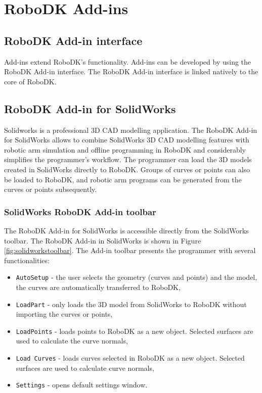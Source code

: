 \section{RoboDK Add-ins}

\subsection{RoboDK Add-in interface}

Add-ins extend RoboDK's functionality. Add-ins can be developed by using the RoboDK Add-in interface. The RoboDK Add-in interface is linked natively to the core of RoboDK.

\subsection{RoboDK Add-in for SolidWorks}

Solidworks is a professional 3D CAD modelling application. The RoboDK Add-in for SolidWorks allows to combine SolidWorks 3D CAD modelling features with robotic arm simulation and offline programming in RoboDK and considerably simplifies the programmer's workflow. The programmer can load the 3D models created in SolidWorks directly to RoboDK. Groups of curves or points can also be loaded to RoboDK, and robotic arm programs can be generated from the curves or points subsequently.

\subsubsection*{SolidWorks RoboDK Add-in toolbar}

The RoboDK Add-in for SolidWorks is accessible directly from the SolidWorks toolbar.  The RoboDK Add-in in SolidWorks is shown in Figure  \ref{fig:solidworkstoolbar}. The Add-in toolbar presents the programmer with several functionalities:

\begin{itemize}
    \item \texttt{AutoSetup} - the user selects the geometry (curves and points) and the model, the curves are automatically transferred to RoboDK,
    \item \texttt{LoadPart} - only loads the 3D model from SolidWorks to RoboDK without importing the curves or points,
    \item \texttt{LoadPoints} - loads points to RoboDK as a new object. Selected surfaces are used to calculate the curve normals, 
    \item \texttt{Load Curves} -  loads curves selected in RoboDK as a new object. Selected surfaces are used to calculate curve normals, 
    \item \texttt{Settings} - opens default settings window.
\end{itemize}

